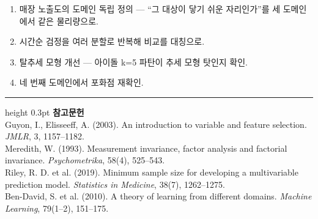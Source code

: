 \documentclass[10pt]{article}
\begin{document}
\begin{enumerate}[leftmargin=1.3em,itemsep=0.15em]
\item 매장 노출도의 도메인 독립 정의 --- ``그 대상이 닿기 쉬운 자리인가''를 세
      도메인에서 같은 물리량으로.
\item 시간순 검정을 여러 분할로 반복해 비교를 대칭으로.
\item 탈추세 모형 개선 --- 아이돌 k=5 파탄이 추세 모형 탓인지 확인.
\item 네 번째 도메인에서 포화점 재확인.
\end{enumerate}

\vspace{0.6em}
\hrule height 0.3pt
\vspace{0.5em}
{\footnotesize
\textbf{참고문헌}\\[0.3em]
Guyon, I., Elisseeff, A. (2003). An introduction to variable and feature selection.
\emph{JMLR}, 3, 1157--1182.\\[0.15em]
Meredith, W. (1993). Measurement invariance, factor analysis and factorial
invariance. \emph{Psychometrika}, 58(4), 525--543.\\[0.15em]
Riley, R. D. et al. (2019). Minimum sample size for developing a multivariable
prediction model. \emph{Statistics in Medicine}, 38(7), 1262--1275.\\[0.15em]
Ben-David, S. et al. (2010). A theory of learning from different domains.
\emph{Machine Learning}, 79(1--2), 151--175.
}
\end{document}
